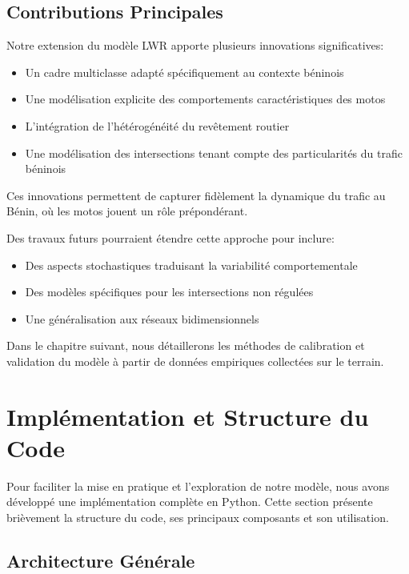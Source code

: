 \subsection{Contributions Principales}
\label{subsec:contributions}

Notre extension du modèle LWR apporte plusieurs innovations significatives:
\begin{itemize}
\item Un cadre multiclasse adapté spécifiquement au contexte béninois
\item Une modélisation explicite des comportements caractéristiques des motos
\item L'intégration de l'hétérogénéité du revêtement routier
\item Une modélisation des intersections tenant compte des particularités du trafic béninois
\end{itemize}

Ces innovations permettent de capturer fidèlement la dynamique du trafic au Bénin, où les motos jouent un rôle prépondérant.

Des travaux futurs pourraient étendre cette approche pour inclure:
\begin{itemize}
\item Des aspects stochastiques traduisant la variabilité comportementale \cite{marbach2009stochastic}
\item Des modèles spécifiques pour les intersections non régulées \cite{ceylan2014traffic}
\item Une généralisation aux réseaux bidimensionnels \cite{zhang2003non}
\end{itemize}

Dans le chapitre suivant, nous détaillerons les méthodes de calibration et validation du modèle à partir de données empiriques collectées sur le terrain.

\section{Implémentation et Structure du Code}
\label{sec:implementation}

Pour faciliter la mise en pratique et l'exploration de notre modèle, nous avons développé une implémentation complète en Python. Cette section présente brièvement la structure du code, ses principaux composants et son utilisation.

\subsection{Architecture Générale}
\label{subsec:architecture}

